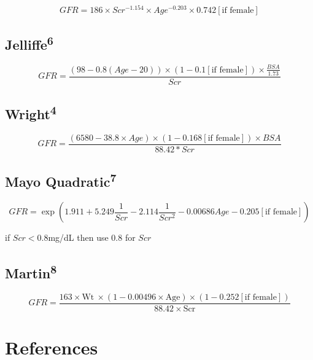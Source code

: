 \documentclass[11pt,]{article}
\begin{document}
\begin{equation*}
GFR = 186 \times Scr^{-1.154} \times Age^{-0.203} \times 0.742 [\text{if female}]
\end{equation*}

\subsection{\texorpdfstring{Jelliffe\textsuperscript{6}}{Jelliffe6}}\label{jelliffe-jelliffe1973}

\begin{equation*}
GFR = \frac{(98-0.8(Age-20))\times(1-0.1[\text{if female}])\times \frac{BSA}{1.73}}{Scr}
\end{equation*}

\subsection{\texorpdfstring{Wright\textsuperscript{4}}{Wright4}}\label{wright-wright2001}

\begin{equation*}
GFR = \frac{(6580-38.8\times Age)\times(1-0.168[\text{if female}])\times BSA}{88.42*Scr}
\end{equation*}

\subsection{\texorpdfstring{Mayo
Quadratic\textsuperscript{7}}{Mayo Quadratic7}}\label{mayo-quadratic-rule2004}

\begin{equation*}
GFR = \exp \left(1.911 + 5.249\frac{1}{Scr} - 2.114\frac{1}{Scr^2} - 0.00686Age - 0.205 [\text{if female}]\right)
\end{equation*}

if \(Scr < 0.8\)mg/dL then use \(0.8\) for \(Scr\)

\subsection{\texorpdfstring{Martin\textsuperscript{8}}{Martin8}}\label{martin-martin1998}

\begin{equation*}
GFR = \frac{163\times \mathrm{Wt}\ \times(1-0.00496\times \mathrm{Age})\times(1-0.252[\text{if female}])}{88.42\times \mathrm{Scr}}
\end{equation*}

\section*{References}\label{references}
\end{document}
